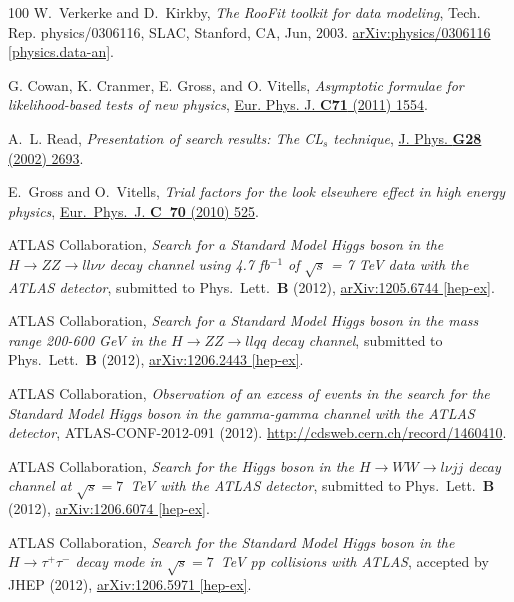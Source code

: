 \documentclass[final,3p,times,twocolumn]{elsarticle}
\begin{document}
\begin{thebibliography}{100}
W.~Verkerke and D.~Kirkby, {\em The RooFit toolkit for data modeling}, Tech.
  Rep. physics/0306116, SLAC, Stanford, CA, Jun, 2003.
\newblock \href{http://arxiv.org/abs/physics/0306116}{{\ttfamily
  arXiv:physics/0306116 [physics.data-an]}}.

{G. Cowan, K. Cranmer, E. Gross, and O. Vitells}, {\em Asymptotic formulae for
  likelihood-based tests of new physics},
  \href{http://dx.doi.org/10.1140/epjc/s10052-011-1554-0}{Eur. Phys. J.
  {\bfseries C71} (2011) 1554}.

A.~L. Read, {\em {Presentation of search results: The CL$_{s}$ technique}},
  \href{http://dx.doi.org/10.1088/0954-3899/28/10/313}{J. Phys. {\bfseries G28}
  (2002) 2693}.

E.~Gross and O.~Vitells, {\em {Trial factors for the look elsewhere effect in
  high energy physics}},
  \href{http://dx.doi.org/10.1140/epjc/s10052-010-1470-8}{Eur.~Phys.~J.
  {\bfseries C~70} (2010) 525}.

{{ATLAS}} Collaboration, {\em {Search for a Standard Model Higgs boson in the
  $H\to ZZ\to ll\nu\nu$ decay channel using 4.7 fb$^{-1}$ of $\sqrt{s}$ = 7 TeV
  data with the ATLAS detector}}, submitted to Phys.~Lett.~{\bf B} (2012),
\href{http://arxiv.org/abs/1205.6744}{{\ttfamily arXiv:1205.6744 [hep-ex]}}.

{{ATLAS}} Collaboration, {\em {Search for a Standard Model Higgs boson in the
  mass range 200-600 GeV in the $H\to ZZ\to llqq$ decay channel}}, submitted to
  Phys.~Lett.~{\bf B} (2012), \href{http://arxiv.org/abs/1206.2443}{{\ttfamily
  arXiv:1206.2443 [hep-ex]}}.

{{ATLAS}} Collaboration, {\em Observation of an excess of events in the search
  for the Standard Model Higgs boson in the gamma-gamma channel with the ATLAS
  detector}, ATLAS-CONF-2012-091 (2012).
  \url{http://cdsweb.cern.ch/record/1460410}.

{ATLAS} Collaboration, {\em {Search for the Higgs boson in the $H\rightarrow
  WW\rightarrow l{\nu}jj$ decay channel at $\sqrt{s} = 7$~TeV with the ATLAS
  detector}}, submitted to Phys.~Lett.~{\bf B} (2012),
  \href{http://arxiv.org/abs/1206.6074}{{\ttfamily arXiv:1206.6074 [hep-ex]}}.

{ATLAS} Collaboration, {\em {Search for the Standard Model Higgs boson in the
  $H\rightarrow \tau^+\tau^-$ decay mode in $\sqrt{s}=7$~TeV pp collisions with
  ATLAS}}, accepted by JHEP (2012),
  \href{http://arxiv.org/abs/1206.5971}{{\ttfamily arXiv:1206.5971 [hep-ex]}}.


\end{thebibliography}
\end{document}
